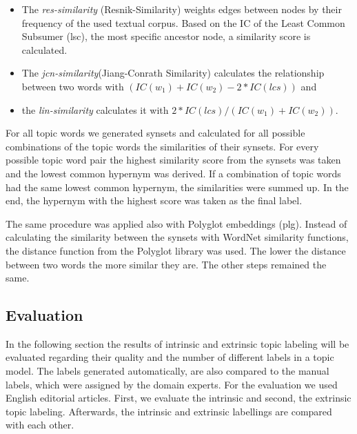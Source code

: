 {\begin{itemize}
\item The \textit{res-similarity} (Resnik-Similarity) weights edges between nodes by their frequency of the used textual corpus. Based on the \ac{IC} of the Least Common Subsumer (lsc), the most specific ancestor node, a similarity score is calculated.
\item The \textit{jcn-similarity}(Jiang-Conrath Similarity) calculates the relationship between two words with $(IC(w_{1}) + IC(w_{2}) - 2 * IC(lcs))$ and \item the \textit{lin-similarity} calculates it with $2 * IC(lcs) / (IC(w_{1}) + IC(w_{2}))$.
\end{itemize}

For all topic words we generated synsets and calculated for all possible combinations of the topic words the similarities of their synsets. For every possible topic word pair the highest similarity score from the synsets was taken and the lowest common hypernym was derived. If a combination of topic words had the same lowest common hypernym, the similarities were summed up. In the end, the hypernym with the highest score was taken as the final label. 

The same procedure was applied also with Polyglot embeddings (plg). Instead of calculating the similarity between the synsets with WordNet similarity functions, the distance function from the Polyglot library was used. The lower the distance between two words the more similar they are. The other steps remained the same.

\subsection{Evaluation}
In the following section the results of intrinsic and extrinsic topic labeling will be evaluated regarding their quality and the number of different labels in a topic model. The labels generated automatically, are also compared to the manual labels, which were assigned by the domain experts. For the evaluation we used English editorial articles. %
First, we evaluate the intrinsic and second, the extrinsic topic labeling. Afterwards, the intrinsic and extrinsic labellings are compared with each other. 

}
